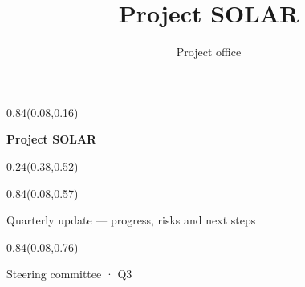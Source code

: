 \documentclass[aspectratio=169]{beamer}
\title{Project SOLAR}
\author{Project office}
\begin{document}
\begin{frame}[t]

\begin{textblock}{0.84}(0.08,0.16)
{\centering\fontsize{32}{38}\selectfont \textcolor[HTML]{1A1A1A}{\textbf{Project SOLAR}}\par}
\end{textblock}

\begin{textblock}{0.24}(0.38,0.52)
\end{textblock}

\begin{textblock}{0.84}(0.08,0.57)
{\centering\fontsize{17}{20}\selectfont \textcolor[HTML]{555555}{Quarterly update — progress, risks and next steps}\par}
\end{textblock}

\begin{textblock}{0.84}(0.08,0.76)
{\centering\fontsize{13}{16}\selectfont \textcolor[HTML]{555555}{Steering committee  ·  Q3}\par}
\end{textblock}
\end{frame}
\end{document}
